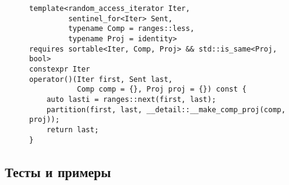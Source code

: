 \begin{figure}[t]
\begin{lstlisting}[caption={Предложенная спецификация сортировки}, label={listing::sort}]
template<random_access_iterator Iter,
         sentinel_for<Iter> Sent,
         typename Comp = ranges::less,
         typename Proj = identity>
requires sortable<Iter, Comp, Proj> && std::is_same<Proj, bool>
constexpr Iter
operator()(Iter first, Sent last,
           Comp comp = {}, Proj proj = {}) const {
    auto lasti = ranges::next(first, last);
    partition(first, last, __detail::__make_comp_proj(comp, proj));
    return last;
}
\end{lstlisting}
\end{figure}
\subsection{Тесты и примеры}
